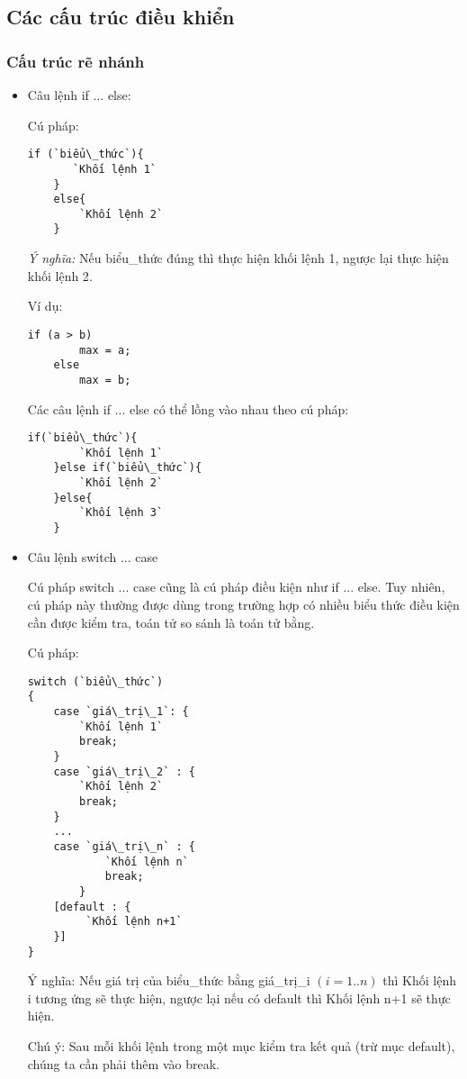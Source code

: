 \subsection{Các cấu trúc điều khiển}
\subsubsection{Cấu trúc rẽ nhánh}
\begin{itemize}


\item	Câu lệnh  {\ttfamily if ... else}:

Cú pháp:
\lstset{language=C++}
\begin{lstlisting}[escapechar=`]
	if (`biểu\_thức`){
	   `Khối lệnh 1`
	}
	else{
	    `Khối lệnh 2`
	}
\end{lstlisting}
\textit{Ý nghĩa:} Nếu {\ttfamily  biểu\_thức} đúng thì thực hiện {\ttfamily  khối lệnh 1}, ngược lại thực hiện {\ttfamily  khối lệnh 2}.

Ví dụ:
\lstset{language=XML}
\begin{lstlisting}[escapechar=`]
	if (a > b)
		max = a;
	else
		max = b; 
\end{lstlisting}

Các câu lệnh {\ttfamily if ... else} có thể lồng vào nhau theo cú pháp:
\lstset{language=C++}
\begin{lstlisting}[escapechar=`]
	if(`biểu\_thức`){
	    `Khối lệnh 1`
	}else if(`biểu\_thức`){
	    `Khối lệnh 2`
	}else{
	    `Khối lệnh 3`
	}
\end{lstlisting}


\item	Câu lệnh {\ttfamily  switch ... case}

Cú pháp {\ttfamily switch ... case} cũng là cú pháp điều kiện như {\ttfamily if ... else}. Tuy nhiên, cú pháp này thường được dùng trong trường hợp có nhiều biểu thức điều kiện cần được kiểm tra, toán tử so sánh là toán tử bằng.

Cú pháp:
\lstset{language=XML}
\begin{lstlisting}[escapechar=`]
switch (`biểu\_thức`)
{
    case `giá\_trị\_1`: {
        `Khối lệnh 1`
        break;
    }
    case `giá\_trị\_2` : {
        `Khối lệnh 2`
        break;
    }
    ...
    case `giá\_trị\_n` : {
            `Khối lệnh n`
            break;
        }
    [default : {
         `Khối lệnh n+1`
    }]
}
\end{lstlisting}
Ý nghĩa: Nếu giá trị của {\ttfamily biểu\_thức}  bằng {\ttfamily giá\_trị\_i $ (i=1..n) $ } thì {\ttfamily Khối lệnh i} tương ứng sẽ thực hiện, ngược lại nếu có {\ttfamily default} thì {\ttfamily Khối lệnh n+1} sẽ thực hiện.

Chú ý: Sau mỗi khối lệnh trong một mục kiểm tra kết quả (trừ mục {\ttfamily default}), chúng ta cần phải thêm vào {\ttfamily break}.
\end{itemize}
